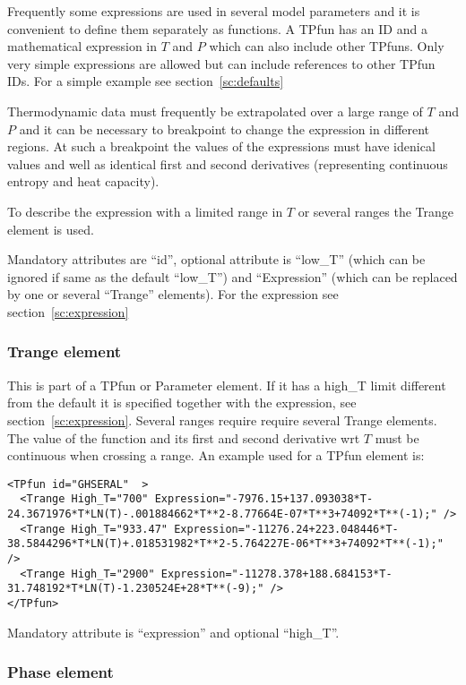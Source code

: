 \documentclass[12pt]{article}
\begin{document}
\begin{appendices}
Frequently some expressions are used in several model parameters and
it is convenient to define them separately as functions.  A TPfun has
an ID and a mathematical expression in $T$ and $P$ which can also
include other TPfuns.  Only very simple expressions are allowed but
can include references to other TPfun IDs.  For a simple example
see section~\ref{sc:defaults}

Thermodynamic data must frequently be extrapolated over a large range
of $T$ and $P$ and it can be necessary to breakpoint to change the
expression in different regions.  At such a breakpoint the values of
the expressions must have idenical values and well as identical first
and second derivatives (representing continuous entropy and heat
capacity).

To describe the expression with a limited range in $T$ or several
ranges the Trange element is used.

Mandatory attributes are ``id'', optional attribute is ``low\_T''
(which can be ignored if same as the default ``low\_T'') and
``Expression'' (which can be replaced by one or several ``Trange''
elements).  For the expression see section~\ref{sc:expression}

\subsubsection{Trange element}

This is part of a TPfun or Parameter element.  If it has a high\_T
limit different from the default it is specified together with the
expression, see section~\ref{sc:expression}.  Several ranges require
require several Trange elements.  The value of the function and its
first and second derivative wrt $T$ must be continuous when crossing a
range.  An example used for a TPfun element is:
{\small
\begin{verbatim}
<TPfun id="GHSERAL"  >
  <Trange High_T="700" Expression="-7976.15+137.093038*T-24.3671976*T*LN(T)-.001884662*T**2-8.77664E-07*T**3+74092*T**(-1);" />
  <Trange High_T="933.47" Expression="-11276.24+223.048446*T-38.5844296*T*LN(T)+.018531982*T**2-5.764227E-06*T**3+74092*T**(-1);" />
  <Trange High_T="2900" Expression="-11278.378+188.684153*T-31.748192*T*LN(T)-1.230524E+28*T**(-9);" />
</TPfun>
\end{verbatim}
}

Mandatory attribute is ``expression'' and optional ``high\_T''.

\subsubsection{Phase element}


\end{appendices}
\end{document}
